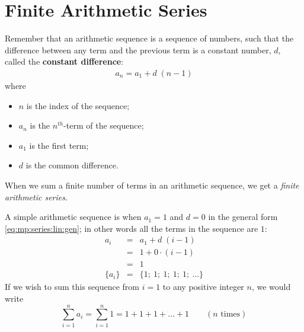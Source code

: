 
\section{Finite Arithmetic Series}

Remember that an arithmetic sequence is a sequence of numbers, such that the difference between any term and the previous term is a constant number, $d$, called the \textbf{constant difference}:
\begin{eqnarray}
\label{eq:mp:series:lin:gen}
a_n = a_1 + d \; (n - 1)
\end{eqnarray}
where
\begin{itemize}
\item $n$ is the index of the sequence;
\item $a_n$ is the $n^{th}$-term of the sequence;
\item $a_1$ is the first term;
\item $d$ is the common difference.
\end{itemize}

When we sum a finite number of terms in an arithmetic sequence, we get a \textit{finite arithmetic series}.

A simple arithmetic sequence is when $a_1=1$ and $d=0$ in the general form \eqref{eq:mp:series:lin:gen}; in other words all the terms in the sequence are $1$:
\begin{eqnarray*}
a_i &=& a_1 + d \; (i - 1) \\
&=& 1 + 0 \cdot (i - 1) \\
&=& 1 \\
\{a_i\} &=& \{1; \: 1; \: 1; \: 1; \: 1; \: \ldots \}
\end{eqnarray*}
If we wish to sum this sequence from $i=1$ to any positive integer $n$, we would write
\begin{equation*}
\sum_{i=1}^n {a_i} = \sum_{i=1}^n 1 = 1 + 1 + 1 + \ldots + 1 \qquad (n\textrm{ times})
\end{equation*}

